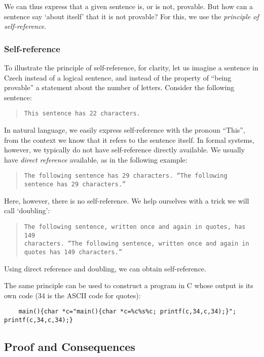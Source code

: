     We can thus express that a given sentence is, or is not, provable. But how can a sentence say `about itself' that it is not provable? For this, we use the \emph{principle of self-reference}.
    
    \subsubsection*{Self-reference}
    
    To illustrate the principle of self-reference, for clarity, let us imagine a sentence in Czech instead of a logical sentence, and instead of the property of ``being provable'' a statement about the number of letters. Consider the following sentence:
    \begin{quote}
        \texttt{This sentence has 22 characters.}
    \end{quote}
    In natural language, we easily express self-reference with the pronoun ``This'', from the context we know that it refers to the sentence itself. In formal systems, however, we typically do not have self-reference directly available. We usually have \emph{direct reference} available, as in the following example:
    \begin{quote}
        \texttt{The following sentence has 29 characters. ``The following sentence has 29 characters.''}
    \end{quote}
    Here, however, there is no self-reference. We help ourselves with a trick we will call `doubling':
    \begin{quote}
        \texttt{The following sentence, written once and again in quotes, has 149\\ characters. ``The following sentence, written once and again in quotes\\ has 149 characters.''}
    \end{quote}
    Using direct reference and doubling, we can obtain self-reference.
    \begin{remark}
        The same principle can be used to construct a program in C whose output is its own code (34 is the ASCII code for quotes):    
    {\small
    \begin{verbatim}
    main(){char *c="main(){char *c=%c%s%c; printf(c,34,c,34);}"; printf(c,34,c,34);}    
    \end{verbatim}
    }
    \end{remark}
    
    \subsection{Proof and Consequences}
    
